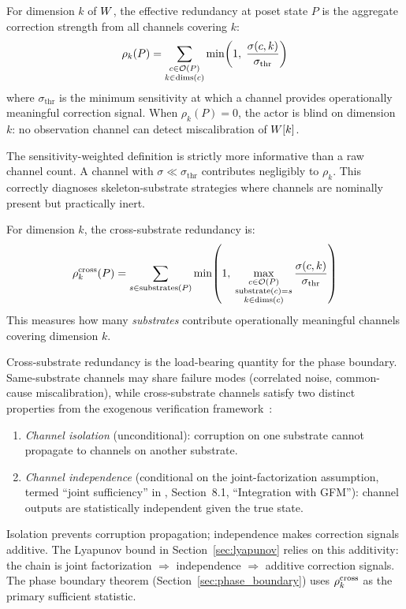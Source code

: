 \begin{definition}
\label{def:redundancy}
For dimension $k$ of $W$, the effective redundancy at poset state $P$
is the aggregate correction strength from all channels covering $k$:
\begin{equation}
\label{eq:redundancy}
\rho_k(P) = \sum_{\substack{c \in \mathcal{O}(P) \\ k \in \mathrm{dims}(c)}}
  \min\!\left(1,\; \frac{\sigma(c, k)}{\sigma_{\mathrm{thr}}}\right)
\end{equation}
where $\sigma_{\mathrm{thr}}$ is the minimum sensitivity at which a
channel provides operationally meaningful correction signal.  When
$\rho_k(P) = 0$, the actor is blind on dimension $k$: no observation
channel can detect miscalibration of $W[k]$.
\end{definition}

The sensitivity-weighted definition is strictly more informative than
a raw channel count.  A channel with $\sigma \ll \sigma_{\mathrm{thr}}$
contributes negligibly to $\rho_k$.  This correctly diagnoses
skeleton-substrate strategies where channels are nominally present
but practically inert.

\begin{definition}
\label{def:cross_redundancy}
For dimension $k$, the cross-substrate redundancy is:
\begin{equation}
\label{eq:cross_redundancy}
\rho^{\mathrm{cross}}_k(P) = \sum_{s \in \mathrm{substrates}(P)}
  \min\!\left(1,\;
    \max_{\substack{c \in \mathcal{O}(P) \\ \mathrm{substrate}(c) = s \\
    k \in \mathrm{dims}(c)}}
    \frac{\sigma(c, k)}{\sigma_{\mathrm{thr}}}
  \right)
\end{equation}
This measures how many \emph{substrates} contribute operationally
meaningful channels covering dimension $k$.
\end{definition}

Cross-substrate redundancy is the load-bearing quantity for the phase
boundary.  Same-substrate channels may share failure modes (correlated
noise, common-cause miscalibration), while cross-substrate channels
satisfy two distinct properties from
the exogenous verification framework~\citep{lasser2026exo}:
\begin{enumerate}
\item[(a)] \emph{Channel isolation} (unconditional): corruption on one
  substrate cannot propagate to channels on another substrate.
\item[(b)] \emph{Channel independence} (conditional on the
  joint-factorization assumption, termed ``joint sufficiency'' in
  \citet{lasser2026exo}, Section~8.1, ``Integration with GFM''): channel
  outputs are statistically independent given the true state.
\end{enumerate}
Isolation prevents corruption propagation; independence makes correction
signals additive.  The Lyapunov bound in
Section~\ref{sec:lyapunov} relies on this additivity: the chain
is joint factorization $\Rightarrow$ independence $\Rightarrow$
additive correction signals.  The phase boundary
theorem (Section~\ref{sec:phase_boundary}) uses $\rho^{\mathrm{cross}}_k$ as the
primary sufficient statistic.

